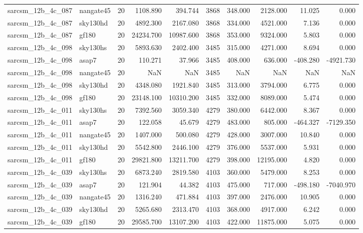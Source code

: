 \documentclass{article}
\begin{document}
\begin{longtable}{llrrrrrrrr}
sarcsm\_12b\_4c\_087 & nangate45 & 20 & 1108.890 & 394.744 & 3868 & 348.000 & 2128.000 & 11.025 & 0.000 \\
sarcsm\_12b\_4c\_087 & sky130hd & 20 & 4892.300 & 2167.080 & 3868 & 334.000 & 4521.000 & 7.136 & 0.000 \\
sarcsm\_12b\_4c\_087 & gf180 & 20 & 24234.700 & 10987.600 & 3868 & 353.000 & 9324.000 & 5.803 & 0.000 \\
sarcsm\_12b\_4c\_098 & sky130hs & 20 & 5893.630 & 2402.400 & 3485 & 315.000 & 4271.000 & 8.694 & 0.000 \\
sarcsm\_12b\_4c\_098 & asap7 & 20 & 110.271 & 37.966 & 3485 & 408.000 & 636.000 & -408.280 & -4921.730 \\
sarcsm\_12b\_4c\_098 & nangate45 & 20 & NaN & NaN & 3485 & NaN & NaN & NaN & NaN \\
sarcsm\_12b\_4c\_098 & sky130hd & 20 & 4348.080 & 1921.840 & 3485 & 313.000 & 3794.000 & 6.775 & 0.000 \\
sarcsm\_12b\_4c\_098 & gf180 & 20 & 23148.100 & 10310.200 & 3485 & 332.000 & 8089.000 & 5.474 & 0.000 \\
sarcsm\_12b\_4c\_011 & sky130hs & 20 & 7392.560 & 3059.340 & 4279 & 380.000 & 6442.000 & 8.367 & 0.000 \\
sarcsm\_12b\_4c\_011 & asap7 & 20 & 122.058 & 45.679 & 4279 & 483.000 & 805.000 & -464.327 & -7129.350 \\
sarcsm\_12b\_4c\_011 & nangate45 & 20 & 1407.000 & 500.080 & 4279 & 428.000 & 3007.000 & 10.840 & 0.000 \\
sarcsm\_12b\_4c\_011 & sky130hd & 20 & 5542.800 & 2446.100 & 4279 & 376.000 & 5537.000 & 5.931 & 0.000 \\
sarcsm\_12b\_4c\_011 & gf180 & 20 & 29821.800 & 13211.700 & 4279 & 398.000 & 12195.000 & 4.820 & 0.000 \\
sarcsm\_12b\_4c\_039 & sky130hs & 20 & 6873.240 & 2819.580 & 4103 & 360.000 & 5479.000 & 8.253 & 0.000 \\
sarcsm\_12b\_4c\_039 & asap7 & 20 & 121.904 & 44.382 & 4103 & 475.000 & 717.000 & -498.180 & -7040.970 \\
sarcsm\_12b\_4c\_039 & nangate45 & 20 & 1316.240 & 471.884 & 4103 & 397.000 & 2476.000 & 10.905 & 0.000 \\
sarcsm\_12b\_4c\_039 & sky130hd & 20 & 5265.680 & 2313.470 & 4103 & 368.000 & 4917.000 & 6.242 & 0.000 \\
sarcsm\_12b\_4c\_039 & gf180 & 20 & 29585.700 & 13107.200 & 4103 & 422.000 & 11875.000 & 5.075 & 0.000 \\

\end{longtable}
\end{document}
